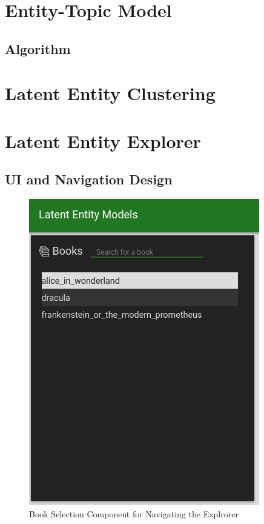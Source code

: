 \documentclass[10pt]{report}
\begin{document}
\section{Entity-Topic Model}

\subsection{Algorithm}

\section{Latent Entity Clustering }

\section{Latent Entity Explorer}
\subsection{UI and Navigation Design }
\begin{figure}[B!]
  \centering
  \includegraphics[scale=0.5]{book_list}
\caption{Book Selection Component for Navigating the Explrorer\label{fig:book_selection}}
\end{figure}
\end{document}

